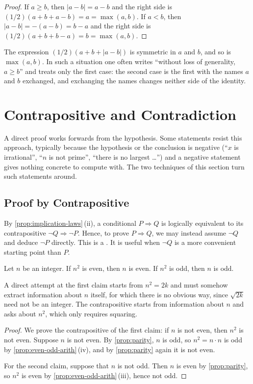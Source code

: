 \begin{proof}
If $a\ge b$, then $|a-b|=a-b$ and the right side is $(1/2)(a+b+a-b)=a=\max(a,b)$. If $a<b$, then $|a-b|=-(a-b)=b-a$ and the right side is $(1/2)(a+b+b-a)=b=\max(a,b)$.
\end{proof}

The expression $(1/2)(a+b+|a-b|)$ is symmetric in $a$ and $b$, and so is $\max(a,b)$. In such a situation one often writes ``without loss of generality, $a\ge b$'' and treats only the first case: the second case is the first with the names $a$ and $b$ exchanged, and exchanging the names changes neither side of the identity.

\section{Contrapositive and Contradiction}
\label{sec:contradiction}

A direct proof works forwards from the hypothesis. Some statements resist this approach, typically because the hypothesis or the conclusion is negative (``$x$ is irrational'', ``$n$ is not prime'', ``there is no largest \ldots'') and a negative statement gives nothing concrete to compute with. The two techniques of this section turn such statements around.

\subsection{Proof by Contrapositive}

By \cref{prop:implication-laws}\,(ii), a conditional $P\Rightarrow Q$ is logically equivalent to its contrapositive $\neg Q\Rightarrow\neg P$. Hence, to prove $P\Rightarrow Q$, we may instead assume $\neg Q$ and deduce $\neg P$ directly. This is a . It is useful when $\neg Q$ is a more convenient starting point than $P$.

\begin{proposition}
\label{prop:square-even}
Let $n$ be an integer. If $n^2$ is even, then $n$ is even. If $n^2$ is odd, then $n$ is odd.
\end{proposition}

A direct attempt at the first claim starts from $n^2=2k$ and must somehow extract information about $n$ itself, for which there is no obvious way, since $\sqrt{2k}$ need not be an integer. The contrapositive starts from information about $n$ and asks about $n^2$, which only requires squaring.

\begin{proof}
We prove the contrapositive of the first claim: if $n$ is not even, then $n^2$ is not even. Suppose $n$ is not even. By \cref{prop:parity}, $n$ is odd, so $n^2=n\cdot n$ is odd by \cref{prop:even-odd-arith}\,(iv), and by \cref{prop:parity} again it is not even.

For the second claim, suppose that $n$ is not odd. Then $n$ is even by \cref{prop:parity}, so $n^2$ is even by \cref{prop:even-odd-arith}\,(iii), hence not odd.
\end{proof}


